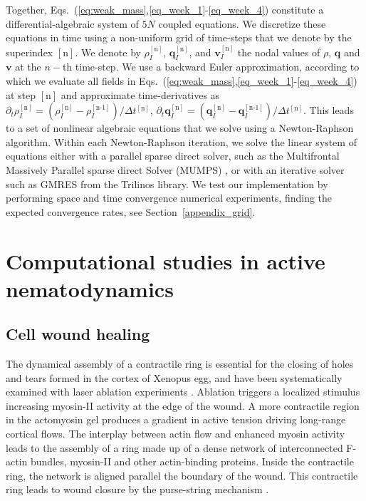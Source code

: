 Together,  Eqs.~(\ref{eq:weak_mass},\ref{eq_week_1}-\ref{eq_week_4}) constitute a differential-algebraic system of $5N$ coupled equations. We discretize these equations in time using a non-uniform grid of time-steps that we denote by the superindex $[\text{n}]$. We denote by $\rho^{[\text{n}]}_I$, $\bm{q}^{[\text{n}]}_I$, and $\bm{v}^{[\text{n}]}_I$ the nodal values of $\rho$, $\bm{q}$ and $\bm{v}$ at the $n-$th time-step. We use a backward Euler approximation, according to which we evaluate all fields in Eqs.~(\ref{eq:weak_mass},\ref{eq_week_1}-\ref{eq_week_4}) at step $[\text{n}]$ and approximate time-derivatives as $\partial_t \rho_I^{[\text{n}]} = (\rho^{[\text{n}]}_I-\rho^{[\text{n-1}]}_I)/\Delta t^{[\text{n}]}$, $\partial_t \bm{q}_I^{[\text{n}]} = (\bm{q}^{[\text{n}]}_I-\bm{q}^{[\text{n-1}]}_I)/\Delta t^{[\text{n}]}$. This leads to a set of nonlinear algebraic equations that we solve using a Newton-Raphson algorithm. Within each Newton-Raphson iteration, we solve the linear system of equations either  with a parallel sparse direct solver, such as the Multifrontal Massively Parallel sparse direct Solver (MUMPS) \cite{Amestoy2011}, or with an iterative solver such as GMRES  \cite{osti_974892, ref1,ref2} from the Trilinos library.
We test our implementation by performing space and time convergence numerical experiments, finding the expected convergence rates, see  Section~\ref{appendix_grid}.

\section{Computational studies in active nematodynamics}

	\subsection{Cell wound healing}
The dynamical assembly of a contractile ring is essential for the closing of holes and tears formed in the cortex of Xenopus egg, and have been systematically examined with laser ablation experiments \cite{benink2000,mandato2001}. Ablation triggers a localized stimulus increasing myosin-II activity at the edge of the wound. A more contractile region in the actomyosin gel produces a gradient in active tension driving long-range cortical flows. The interplay between actin flow and enhanced myosin activity leads to the assembly of a ring made up of a dense network of interconnected F-actin bundles, myosin-II and other actin-binding proteins. Inside the contractile ring, the network is aligned parallel the boundary of the wound. This contractile ring leads to wound closure by the purse-string mechanism \cite{Alice2008}.

